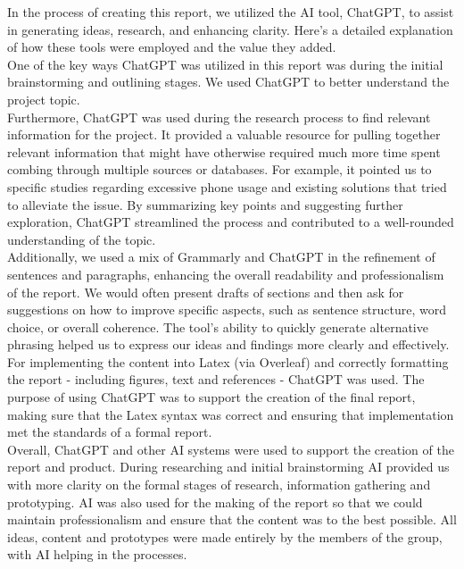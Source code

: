 \documentclass[sigconf, 11pt]{acmart}
\begin{document}
In the process of creating this report, we utilized the AI tool, ChatGPT, to assist in generating ideas, research, and enhancing clarity. Here's a detailed explanation of how these tools were employed and the value they added.
\\

One of the key ways ChatGPT was utilized in this report was during the initial brainstorming and outlining stages. We used ChatGPT to better understand the project topic.
\\

Furthermore, ChatGPT was used during the research process to find relevant information for the project. It provided a valuable resource for pulling together relevant information that might have otherwise required much more time spent combing through multiple sources or databases. For example, it pointed us to specific studies regarding excessive phone usage and existing solutions that tried to alleviate the issue. By summarizing key points and suggesting further exploration, ChatGPT streamlined the process and contributed to a well-rounded understanding of the topic.
\\

Additionally, we used a mix of Grammarly and ChatGPT in the refinement of sentences and paragraphs, enhancing the overall readability and professionalism of the report. We would often present drafts of sections and then ask for suggestions on how to improve specific aspects, such as sentence structure, word choice, or overall coherence. The tool’s ability to quickly generate alternative phrasing helped us to express our ideas and findings more clearly and effectively.
\\

For implementing the content into Latex (via Overleaf) and correctly formatting the report - including figures, text and references - ChatGPT was used. The purpose of using ChatGPT was to support the creation of the final report, making sure that the Latex syntax was correct and ensuring that implementation met the standards of a formal report.
\\

Overall, ChatGPT and other AI systems were used to support the creation of the report and product. During researching and initial brainstorming AI provided us with more clarity on the formal stages of research, information gathering and prototyping. AI was also used for the making of the report so that we could maintain professionalism and ensure that the content was to the best possible. All ideas, content and prototypes were made entirely by the members of the group, with AI helping in the processes. 
\end{document}
